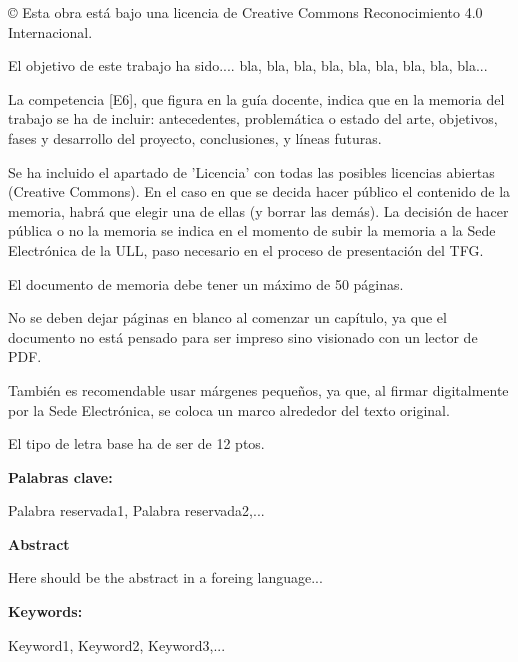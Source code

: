 \documentclass[a4paper,12pt,oneside]{scrbook}
\newenvironment{abstract}[1][\abstractname]{
    \cleardoublepageusingstyle{empty}
    \thispagestyle{empty}
    \begin{center}\textbf{#1}\end{center}
    \begin{itshape}\par\noindent%
}
{\end{itshape}}
\newenvironment{keywords}[1][Keywords]
{\vspace{7pt}\par\noindent\textup{\textbf{#1: }}\begin{upshape}}
{\end{upshape}}
\begin{document}
\begin{large}
© Esta obra está bajo una licencia de Creative Commons Reconocimiento 4.0 Internacional.
\end{large}

\begin{abstract}
El objetivo de este trabajo ha sido.... bla, bla, bla, bla, bla, bla, bla, bla, bla...

La competencia [E6], que figura en la guía docente, indica que en la memoria del trabajo se ha de incluir: antecedentes, problemática o estado del arte, objetivos, fases y desarrollo del proyecto, conclusiones, y líneas futuras.

Se ha incluido el apartado de 'Licencia' con todas las posibles licencias abiertas (Creative Commons). En el caso en que se decida hacer público el contenido de la memoria, habrá que elegir una de ellas (y borrar las demás). La decisión de hacer pública o no la memoria se indica en el momento de subir la memoria a la Sede Electrónica de la ULL, paso necesario en el proceso de presentación del TFG.

El documento de memoria debe tener un máximo de 50 páginas.

No se deben dejar páginas en blanco al comenzar un capítulo, ya que el documento no está pensado para ser impreso sino visionado con un lector de PDF.

También es recomendable usar márgenes pequeños, ya que, al firmar digitalmente por la Sede Electrónica, se coloca un marco alrededor del texto original.

El tipo de letra base ha de ser de 12 ptos.

\begin{keywords}[Palabras clave]
Palabra reservada1, Palabra reservada2,...
\end{keywords}
\end{abstract}

\thispagestyle{empty}

\begin{abstract}[Abstract]
Here should be the abstract in a foreing language...

\begin {keywords}
Keyword1, Keyword2, Keyword3,...
\end{keywords}
\end{abstract}
\end{document}
